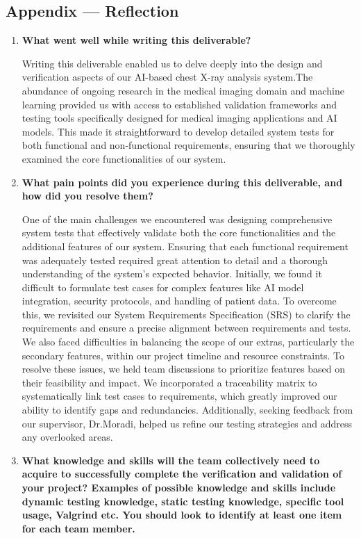 \documentclass[12pt, titlepage]{article}
\begin{document}
\begin{enumerate}
\newpage{}
\section*{Appendix --- Reflection}
\begin{enumerate}
  \item \textbf{What went well while writing this deliverable?}
  
  Writing this deliverable enabled us to delve deeply into the design and verification aspects of our AI-based chest X-ray analysis system.The abundance of ongoing research in the medical imaging domain and machine learning provided us with access to established validation frameworks and testing tools specifically designed for medical imaging applications and AI models. This made it straightforward to develop detailed system tests for both functional and non-functional requirements, ensuring that we thoroughly examined the core functionalities of our system.
  \item \textbf{What pain points did you experience during this deliverable, and how
    did you resolve them?}
    
  One of the main challenges we encountered was designing comprehensive system tests that effectively validate both the core functionalities and the additional features of our system. Ensuring that each functional requirement was adequately tested required great attention to detail and a thorough understanding of the system's expected behavior. Initially, we found it difficult to formulate test cases for complex features like AI model integration, security protocols, and handling of patient data. To overcome this, we revisited our System Requirements Specification (SRS) to clarify the requirements and ensure a precise alignment between requirements and tests. We also faced difficulties in balancing the scope of our extras, particularly the secondary features, within our project timeline and resource constraints. To resolve these issues, we held team discussions to prioritize features based on their feasibility and impact. We incorporated a traceability matrix to systematically link test cases to requirements, which greatly improved our ability to identify gaps and redundancies. Additionally, seeking feedback from our supervisor, Dr.Moradi, helped us refine our testing strategies and address any overlooked areas. 
  \item \textbf{What knowledge and skills will the team collectively need to acquire to
  successfully complete the verification and validation of your project?
  Examples of possible knowledge and skills include dynamic testing knowledge,
  static testing knowledge, specific tool usage, Valgrind etc.  You should look to
  identify at least one item for each team member.}


\end{enumerate}
\end{enumerate}
\end{document}
